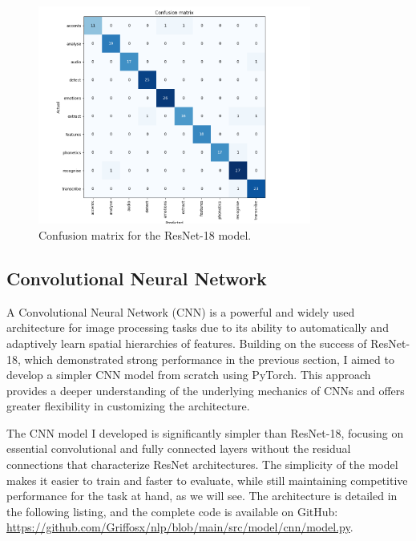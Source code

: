 \documentclass[12pt]{article}
\begin{document}
\begin{figure}[h]
\centering
\includegraphics[width=0.8\textwidth]{confusion_matrix_resnet.png}
\caption{Confusion matrix for the ResNet-18 model.}
\label{fig:confusion_matrix_resnet}
\end{figure}


\subsection{Convolutional Neural Network}

A Convolutional Neural Network (CNN) is a powerful and widely used architecture for image processing tasks due to its ability to automatically and adaptively learn spatial hierarchies of features. Building on the success of ResNet-18, which demonstrated strong performance in the previous section, I aimed to develop a simpler CNN model from scratch using PyTorch. This approach provides a deeper understanding of the underlying mechanics of CNNs and offers greater flexibility in customizing the architecture.

The CNN model I developed is significantly simpler than ResNet-18, focusing on essential convolutional and fully connected layers without the residual connections that characterize ResNet architectures. The simplicity of the model makes it easier to train and faster to evaluate, while still maintaining competitive performance for the task at hand, as we will see. The architecture is detailed in the following listing, and the complete code is available on GitHub: \href{https://github.com/Griffosx/nlp/blob/main/src/model/cnn/model.py}{https://github.com/Griffosx/nlp/blob/main/src/model/cnn/model.py}.
\end{document}
